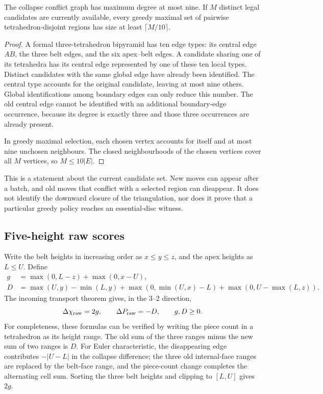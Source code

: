 \begin{theorem}
\label{thm:nine}
The collapse conflict graph has maximum degree at most nine. If $M$
distinct legal candidates are currently available, every greedy maximal
set of pairwise tetrahedron-disjoint regions has size at least
$\lceil M/10\rceil$.
\end{theorem}
\begin{proof}
A formal three-tetrahedron bipyramid has ten edge types: its central
edge $AB$, the three belt edges, and the six apex--belt edges. A candidate
sharing one of its tetrahedra has its central edge represented by one
of these ten local types. Distinct candidates with the same global edge
have already been identified. The central type accounts for the original
candidate, leaving at most nine others. Global identifications among
boundary edges can only reduce this number. The old central edge cannot
be identified with an additional boundary-edge occurrence, because its
degree is exactly three and those three occurrences are already present.

In greedy maximal selection, each chosen vertex accounts for itself and
at most nine unchosen neighbours. The closed neighbourhoods of the
chosen vertices cover all $M$ vertices, so $M\le10|E|$.
\end{proof}

This is a statement about the current candidate set. New moves can
appear after a batch, and old moves that conflict with a selected region
can disappear. It does not identify the downward closure of the
triangulation, nor does it prove that a particular greedy policy reaches
an essential-disc witness.

\subsection{Five-height raw scores}

Write the belt heights in increasing order as $x\le y\le z$, and the
apex heights as $L\le U$. Define
\begin{align}
 g&=\max(0,L-z)+\max(0,x-U),\label{eq:gap}\\
 D&=\max(U,y)-\min(L,y)
   +\max(0,\min(U,x)-L)
   +\max(0,U-\max(L,z)).\label{eq:pieces}
\end{align}
The incoming transport theorem gives, in the $3$--$2$ direction,
\begin{equation}\label{eq:raw-local}
 \Delta\chi_{\rm raw}=2g,\qquad \Delta P_{\rm raw}=-D,
 \qquad g,D\ge0.
\end{equation}
For completeness, these formulas can be verified by writing the piece
count in a tetrahedron as its height range. The old sum of the three
ranges minus the new sum of two ranges is $D$. For Euler characteristic,
the disappearing edge contributes $-|U-L|$ in the collapse difference;
the three old internal-face ranges are replaced by the belt-face range,
and the piece-count change completes the alternating cell sum. Sorting
the three belt heights and clipping to $[L,U]$ gives $2g$.

